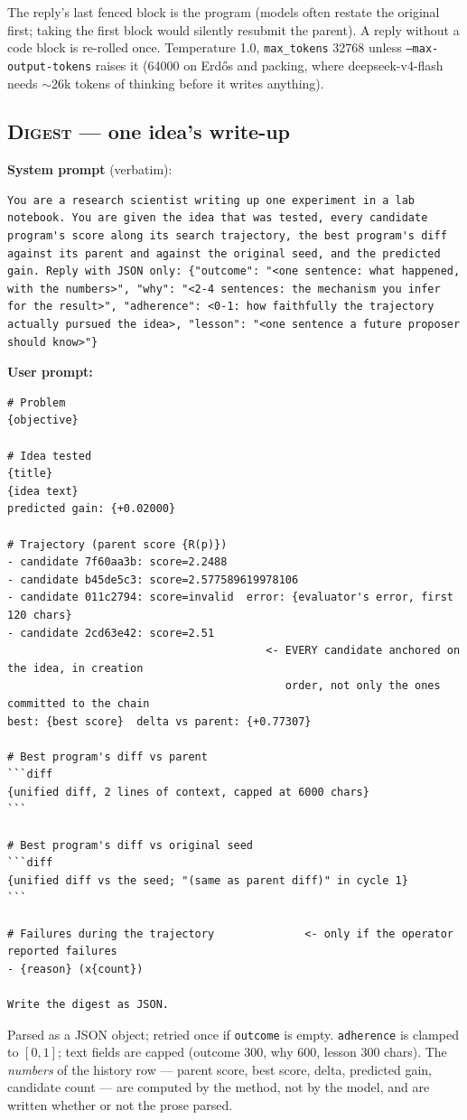 \documentclass[11pt]{article}
\newcommand{\call}[1]{\textsc{#1}}
\begin{document}
The reply's last fenced block is the program (models often restate the original first; taking
the first block would silently resubmit the parent). A reply without a code block is re-rolled
once. Temperature 1.0, \texttt{max\_tokens} 32768 unless \texttt{--max-output-tokens} raises it
(64000 on Erd\H{o}s and packing, where deepseek-v4-flash needs $\sim$26k tokens of thinking
before it writes anything).

\subsection{\call{Digest} --- one idea's write-up}

\noindent\textbf{System prompt} (verbatim):
\begin{lstlisting}
You are a research scientist writing up one experiment in a lab notebook. You are given the idea that was tested, every candidate program's score along its search trajectory, the best program's diff against its parent and against the original seed, and the predicted gain. Reply with JSON only: {"outcome": "<one sentence: what happened, with the numbers>", "why": "<2-4 sentences: the mechanism you infer for the result>", "adherence": <0-1: how faithfully the trajectory actually pursued the idea>, "lesson": "<one sentence a future proposer should know>"}
\end{lstlisting}

\noindent\textbf{User prompt:}
\begin{lstlisting}
# Problem
{objective}

# Idea tested
{title}
{idea text}
predicted gain: {+0.02000}

# Trajectory (parent score {R(p)})
- candidate 7f60aa3b: score=2.2488
- candidate b45de5c3: score=2.577589619978106
- candidate 011c2794: score=invalid  error: {evaluator's error, first 120 chars}
- candidate 2cd63e42: score=2.51
                                        <- EVERY candidate anchored on the idea, in creation
                                           order, not only the ones committed to the chain
best: {best score}  delta vs parent: {+0.77307}

# Best program's diff vs parent
```diff
{unified diff, 2 lines of context, capped at 6000 chars}
```

# Best program's diff vs original seed
```diff
{unified diff vs the seed; "(same as parent diff)" in cycle 1}
```

# Failures during the trajectory              <- only if the operator reported failures
- {reason} (x{count})

Write the digest as JSON.
\end{lstlisting}
Parsed as a JSON object; retried once if \texttt{outcome} is empty. \texttt{adherence} is
clamped to $[0,1]$; text fields are capped (outcome 300, why 600, lesson 300 chars). The
\emph{numbers} of the history row --- parent score, best score, delta, predicted gain, candidate
count --- are computed by the method, not by the model, and are written whether or not the
prose parsed.
\end{document}
